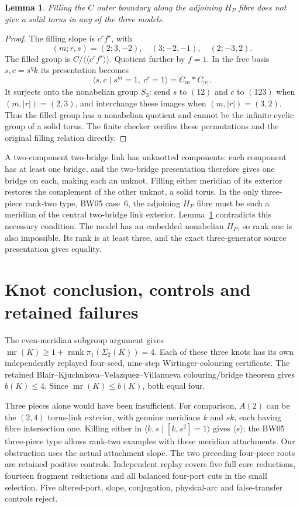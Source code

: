 \documentclass[11pt]{article}
\newtheorem{lemma}[theorem]{Lemma}
\newcommand{\rank}{\operatorname{rank}}
\newcommand{\mr}{\operatorname{mr}}
\begin{document}
\begin{lemma}\label{lem:filling}
Filling the $C$ outer boundary along the adjoining $H_P$ fibre does not
give a solid torus in any of the three models.
\end{lemma}
\begin{proof}
The filling slope is $c^rf^s$, with
\[
 (m;r,s)=(2;3,-2),\quad(3;-2,-1),\quad(2;-3,2).
\]
The filled group is $C/\langle\!\langle c^rf^s\rangle\!\rangle$.
Quotient further by $f=1$. In the free basis $s,c=s^\eta k$ its
presentation becomes
\[
 \langle s,c\mid s^m=1,\ c^r=1\rangle=C_m*C_{|r|}.
\]
It surjects onto the nonabelian group $S_3$: send $s$ to $(12)$ and
$c$ to $(123)$ when $(m,|r|)=(2,3)$, and interchange these images when
$(m,|r|)=(3,2)$. Thus the filled group has a nonabelian quotient and
cannot be the infinite cyclic group of a solid torus. The finite checker
verifies these permutations and the original filling relation directly.
\end{proof}

A two-component two-bridge link has unknotted components: each component
has at least one bridge, and the two-bridge presentation therefore gives
one bridge on each, making each an unknot. Filling either meridian of
its exterior restores the complement of the other unknot, a solid torus.
In the only three-piece rank-two type, BW05 case~6, the adjoining
$H_P$ fibre must be such a meridian of the central two-bridge link
exterior. Lemma~\ref{lem:filling} contradicts this necessary condition.
The model has an embedded nonabelian $H_P$, so rank one is also impossible.
Its rank is at least three, and the exact three-generator source
presentation gives equality.

\section{Knot conclusion, controls and retained failures}

The even-meridian subgroup argument gives
$\mr(K)\ge1+\rank\pi_1(\Sigma_2(K))=4$.
Each of these three knots has its own independently replayed four-seed,
nine-step Wirtinger-colouring certificate. The retained
Blair--Kjuchukova--Velazquez--Villanueva colouring/bridge theorem gives
$b(K)\le4$. Since $\mr(K)\le b(K)$, both equal four.

Three pieces alone would have been insufficient. For comparison,
$A(2)$ can be the $(2,4)$ torus-link exterior, with genuine meridians
$k$ and $sk$, each having fibre intersection one. Killing either in
$\langle k,s\mid[k,s^2]=1\rangle$ gives $\langle s\rangle$;
the BW05 three-piece type allows rank-two examples with these meridian
attachments. Our obstruction uses the actual attachment slope.
The two preceding four-piece roots are retained positive controls.
Independent replay covers five full core reductions, fourteen fragment
reductions and all balanced four-port cuts in the small selection.
Five altered-port, slope, conjugation, physical-arc and false-transfer
controls reject.
\end{document}

